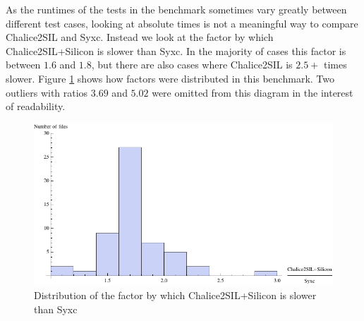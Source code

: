 As the runtimes of the tests in the benchmark sometimes vary greatly between different test cases, looking at absolute times is not a meaningful way to compare Chalice2SIL and Syxc. 
Instead we look at the factor by which Chalice2SIL+Silicon is slower than Syxc. 
In the majority of cases this factor is between $1.6$ and $1.8$, but there are also cases where Chalice2SIL is $2.5+$ times slower.
Figure \ref{fig:full-ratio-distribution} shows how factors were distributed in this benchmark. 
Two outliers with ratios $3.69$ and $5.02$ were omitted from this diagram in the interest of readability.

\begin{figure}
\includegraphics[width=145mm]{src/data/full-ratio-distribution.pdf}
\caption{Distribution of the factor by which Chalice2SIL+Silicon is slower than Syxc}\label{fig:full-ratio-distribution}
\end{figure}




